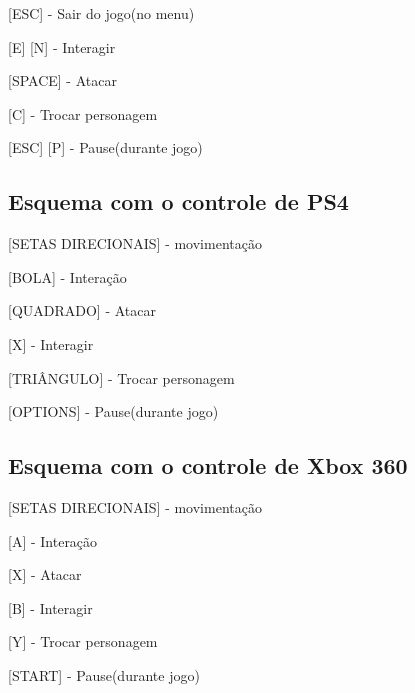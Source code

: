 \documentclass[12pt]{article}
\begin{document}
[ESC] - Sair do jogo(no menu)

[E] [N] - Interagir

[SPACE] - Atacar

[C] - Trocar personagem

[ESC] [P] - Pause(durante jogo)

\subsection{Esquema com o controle de PS4}

[SETAS DIRECIONAIS] - movimentação

[BOLA] - Interação

[QUADRADO] - Atacar

[X] - Interagir

[TRIÂNGULO] - Trocar personagem

[OPTIONS] - Pause(durante jogo)

\subsection{Esquema com o controle de Xbox 360}

[SETAS DIRECIONAIS] - movimentação

[A] - Interação

[X] - Atacar

[B] - Interagir

[Y] - Trocar personagem

[START] - Pause(durante jogo)
\end{document}
